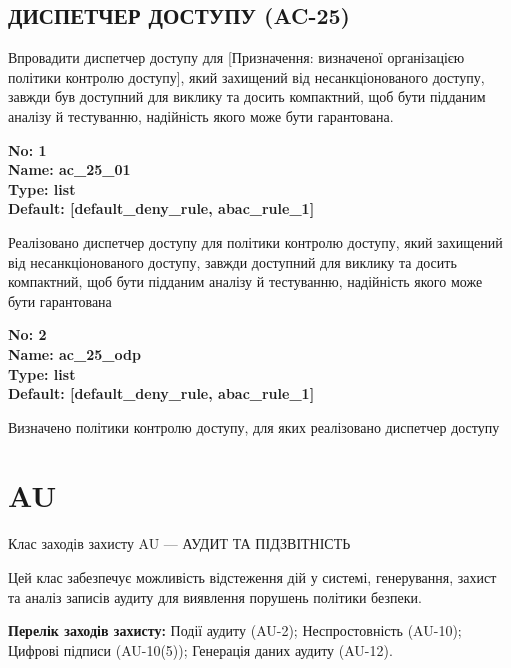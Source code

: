 \documentclass{article}
\begin{document}
\subsection{ДИСПЕТЧЕР ДОСТУПУ (AC-25)}
Впровадити диспетчер доступу для [Призначення: визначеної організацією політики контролю доступу], який захищений від несанкціонованого доступу, завжди був доступний для виклику та досить компактний, щоб бути підданим аналізу й тестуванню, надійність якого може бути гарантована.

\vspace{10pt}
{\footnotesize\bfseries
No: 1\\
Name: ac\_\allowbreak{}25\_\allowbreak{}01\\
Type: list\\
Default: [\textquotedbl{}default\_\allowbreak{}deny\_\allowbreak{}rule\textquotedbl{}, \textquotedbl{}abac\_\allowbreak{}rule\_\allowbreak{}1\textquotedbl{}]
}

{\footnotesize Реалізовано диспетчер доступу для політики контролю доступу, який захищений від несанкціонованого доступу, завжди доступний для виклику та досить компактний, щоб бути підданим аналізу й тестуванню, надійність якого може бути гарантована}


{\footnotesize\bfseries
No: 2\\
Name: ac\_\allowbreak{}25\_\allowbreak{}odp\\
Type: list\\
Default: [\textquotedbl{}default\_\allowbreak{}deny\_\allowbreak{}rule\textquotedbl{}, \textquotedbl{}abac\_\allowbreak{}rule\_\allowbreak{}1\textquotedbl{}]
}

{\footnotesize Визначено політики контролю доступу, для яких реалізовано диспетчер доступу}




\section{AU}
Клас заходів захисту AU --- АУДИТ ТА ПІДЗВІТНІСТЬ

Цей клас забезпечує можливість відстеження дій у системі, генерування, захист та аналіз записів аудиту для виявлення порушень політики безпеки.

\textbf{Перелік заходів захисту:} Події аудиту (AU-2); Неспростовність (AU-10); Цифрові підписи (AU-10(5)); Генерація даних аудиту (AU-12).
\end{document}
